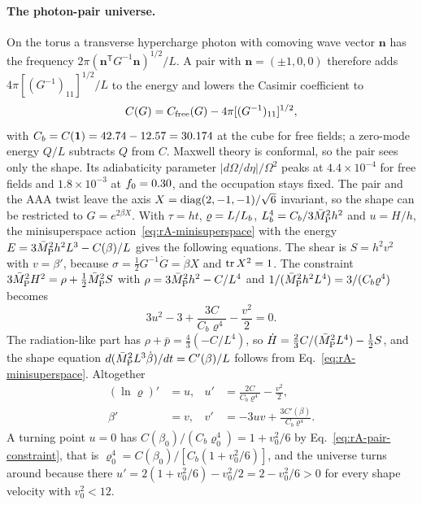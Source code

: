 \paragraph{The photon-pair universe.}
On the torus a transverse hypercharge photon with comoving wave vector $\bm n$ has the frequency $2\pi(\bm n^{\mathsf T}G^{-1}\bm n)^{1/2}/L$.
A pair with $\bm n=(\pm1,0,0)$ therefore adds $4\pi[(G^{-1})_{11}]^{1/2}/L$ to the energy and lowers the Casimir coefficient to
\begin{equation}
C(G)=C_{\rm free}(G)-4\pi[(G^{-1})_{11}]^{1/2},
\end{equation}
with $C_b=C(\mathbf{1})=42.74-12.57=30.174$ at the cube for free fields; a zero-mode energy $Q/L$ subtracts $Q$ from $C$. %
Maxwell theory is conformal, so the pair sees only the shape.
Its adiabaticity parameter $|d\Omega/d\eta|/\Omega^2$ peaks at $4.4\times10^{-4}$ for free fields and $1.8\times10^{-3}$ at $f_0=0.30$, and the occupation stays fixed. %
The pair and the AAA twist leave the axis $X={\rm diag}(2,-1,-1)/\sqrt6$ invariant, so the shape can be restricted to $G=e^{2\beta X}$.
With $\tau=ht$, $\varrho=L/L_b$, $L_b^4=C_b/3\bar M_{\mathrm{P}}^2h^2$ and $u=H/h$, the minisuperspace action~\eqref{eq:rA-minisuperspace} with the energy $E=3\bar M_{\mathrm{P}}^2h^2L^3-C(\beta)/L$ gives the following equations.
The shear is $S=h^2v^2$ with $v=\beta'$, because $\sigma=\tfrac12G^{-1}\dot G=\dot\beta X$ and $\operatorname{tr} X^2=1$.
The constraint $3\bar M_{\mathrm{P}}^2H^2=\rho+\tfrac12\bar M_{\mathrm{P}}^2S$ with $\rho=3\bar M_{\mathrm{P}}^2h^2-C/L^4$ and $1/(\bar M_{\mathrm{P}}^2h^2L^4)=3/(C_b\varrho^4)$ becomes
\begin{equation}
3u^2-3+\frac{3C}{C_b\varrho^4}-\frac{v^2}{2}=0 .
\label{eq:rA-pair-constraint}
\end{equation}
The radiation-like part has $\rho+\bar p=\tfrac43(-C/L^4)$, so $\dot H=\tfrac23C/(\bar M_{\mathrm{P}}^2L^4)-\tfrac12S$, and the shape equation $d(\bar M_{\mathrm{P}}^2L^3\dot\beta)/dt=C'(\beta)/L$ follows from Eq.~\eqref{eq:rA-minisuperspace}.
Altogether
\begin{equation}
\begin{aligned}
(\ln\varrho)'&=u,& u'&=\frac{2C}{C_b\varrho^4}-\frac{v^2}{2},\\
\beta'&=v,& v'&=-3uv+\frac{3C'(\beta)}{C_b\varrho^4}.
\end{aligned}
\label{eq:rA-pair-eqs}
\end{equation}
A turning point $u=0$ has $C(\beta_0)/(C_b\varrho_0^4)=1+v_0^2/6$ by Eq.~\eqref{eq:rA-pair-constraint}, that is $\varrho_0^4=C(\beta_0)/[C_b(1+v_0^2/6)]$, and the universe turns around because there $u'=2(1+v_0^2/6)-v_0^2/2=2-v_0^2/6>0$ for every shape velocity with $v_0^2<12$.

